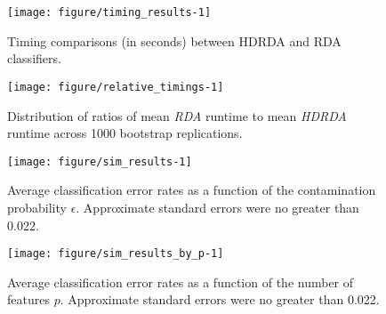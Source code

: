 \documentclass[]{interact}\usepackage[]{graphicx}\usepackage[]{color}
\begin{document}
\clearpage

\begin{figure}
\texttt{[image: figure/timing\_results-1]}
\caption{Timing comparisons (in seconds) between HDRDA and RDA classifiers.}
\label{fig:timing-results}
\end{figure}

\clearpage

\begin{figure}
\texttt{[image: figure/relative\_timings-1]}
\caption{Distribution of ratios of mean \emph{RDA} runtime to mean \emph{HDRDA}
  runtime across 1000 bootstrap replications.}
\label{fig:timing-comparison-bootstrap}
\end{figure}

\clearpage

\begin{figure}
\texttt{[image: figure/sim\_results-1]} 
\caption{Average classification error rates as a function of the contamination
  probability $\epsilon$. Approximate standard errors were no greater than
  0.022.}
\label{fig:sim-results}
\end{figure}

\clearpage

\begin{figure}
\texttt{[image: figure/sim\_results\_by\_p-1]} 
\caption{Average classification error rates as a function of the number of
  features $p$. Approximate standard errors were no greater than
  0.022.}
\label{fig:sim-results-by-p}
\end{figure}
\end{document}
